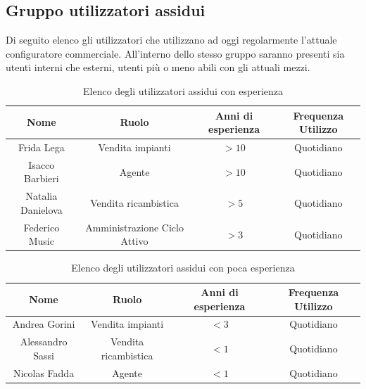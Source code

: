 \documentclass[12pt, a4paper]{article} %
\begin{document}
\subsection{Gruppo utilizzatori assidui}
Di seguito elenco gli utilizzatori che utilizzano ad oggi regolarmente
l'attuale configuratore commerciale. All'interno dello stesso gruppo saranno
presenti sia utenti interni che esterni, utenti più o meno abili con gli
attuali mezzi.
\begin{table}[!ht]
    \centering
    \begin{tabular}{|c|c|c|c|}
        \hline
        \textbf{Nome}     & \textbf{Ruolo}               & \textbf{Anni di esperienza} & \textbf{Frequenza Utilizzo} \\
        \hline
        Frida Lega        & Vendita impianti             & \(>10\)                       & Quotidiano                  \\
        \hline
        Isacco Barbieri   & Agente                       & \(>10\)                       & Quotidiano                  \\
        \hline
        Natalia Danielova & Vendita ricambistica         & \(>5\)                        & Quotidiano                  \\
        \hline
        Federico Music    & Amministrazione Ciclo Attivo & \(>3\)                        & Quotidiano                  \\
        \hline
    \end{tabular}\label{TableVendorExpert}
    \caption{Elenco degli utilizzatori assidui con esperienza}
\end{table}

\begin{table}[!ht]
    \centering
    \begin{tabular}{|c|c|c|c|}
        \hline
        \textbf{Nome}    & \textbf{Ruolo}       & \textbf{Anni di esperienza} & \textbf{Frequenza Utilizzo} \\
        \hline
        Andrea Gorini    & Vendita impianti     & \(<3\)                        & Quotidiano                  \\
        \hline
        Alessandro Sassi & Vendita ricambistica & \(<1\)                        & Quotidiano                  \\
        \hline
        Nicolas Fadda    & Agente               & \(<1\)                        & Quotidiano                  \\
        \hline
    \end{tabular}\label{TableVendorNewest}
    \caption{Elenco degli utilizzatori assidui con poca esperienza}
\end{table}
\end{document}
